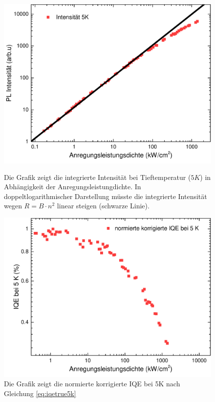 \begin{figure}[ht]
    \centering
    \begin{minipage}[t]{0.49\linewidth}
        \centering
        \includegraphics[width=\linewidth]{Bilder/AugerBei5K.pdf}
        \caption{Die Grafik zeigt die integrierte Intensität bei Tieftemperatur ($5 K$) in Abhängigkeit der Anregungsleistungdichte. In doppeltlogarithmischer Darstellung müsste die integrierte Intensität wegen $R = B \cdot n^2$ linear steigen (schwarze Linie).}
        \label{fig:auger5k}
    \end{minipage}%
    \hfill
    \begin{minipage}[t]{0.49\linewidth}
        \centering
        \includegraphics[width=\linewidth]{Bilder/NormierteKorrgierteIQE5K.pdf}
        \caption{Die Grafik zeigt die normierte korrigierte IQE bei 5K nach Gleichung \ref{eq:iqetrue5k}}
        \label{fig:trueiqe}
    \end{minipage}
\end{figure}
